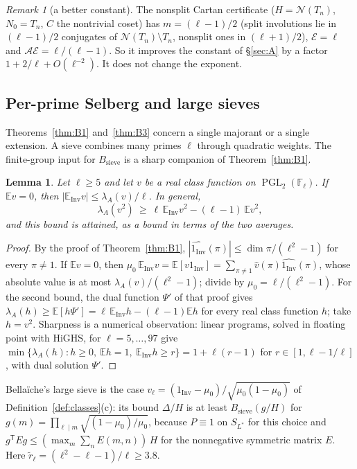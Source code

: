 \documentclass[11pt]{amsart}
\newtheorem{lemma}[theorem]{Lemma}
\theoremstyle{definition}
\theoremstyle{remark}
\newtheorem{remark}[theorem]{Remark}
\newcommand{\F}{\mathbb{F}}
\DeclareMathOperator{\PGL}{PGL}
\newcommand{\Inv}{\mathrm{Inv}}
\newcommand{\Nor}{\mathcal{N}}     %
\newcommand{\cA}{\mathcal{A}}      %
\newcommand{\cE}{\mathcal{E}}      %
\begin{document}
\begin{remark}[a better constant]
The nonsplit Cartan certificate ($H=\Nor(T_n)$, $N_0=T_n$, $C$ the nontrivial coset) has $m=(\ell-1)/2$ (split
involutions lie in $(\ell-1)/2$ conjugates of $\Nor(T_n)\setminus T_n$, nonsplit ones in $(\ell+1)/2$), $\cE=\ell$ and
$\cA\cE=\ell/(\ell-1)$. So it improves the constant of \S\ref{sec:A} by a factor $1+2/\ell+O(\ell^{-2})$. It does not
change the exponent.
\end{remark}

\subsection{Per-prime Selberg and large sieves}\label{subsec:B-sieve}

Theorems~\ref{thm:B1} and~\ref{thm:B3} concern a single majorant or a single extension. A sieve combines many primes
$\ell$ through quadratic weights. The finite-group input for $B_{\mathrm{sieve}}$ is a sharp companion of
Theorem~\ref{thm:B1}.

\begin{lemma}\label{lem:S1}
Let $\ell\ge5$ and let $v$ be a real class function on $\PGL_2(\F_\ell)$. If $\mathbb E v=0$, then
$|\mathbb E_{\Inv}v|\le\lambda_A(v)/\ell$. In general,
\[
  \lambda_A(v^2)\ \ge\ \ell\,\mathbb E_{\Inv}v^2-(\ell-1)\,\mathbb E v^2 ,
\]
and this bound is attained, as a bound in terms of the two averages.
\end{lemma}

\begin{proof}
By the proof of Theorem~\ref{thm:B1}, $|\widehat{1_{\Inv}}(\pi)|\le\dim\pi/(\ell^2-1)$ for every $\pi\ne1$. If
$\mathbb Ev=0$, then $\mu_0\,\mathbb E_{\Inv}v=\mathbb E[v1_{\Inv}]=\sum_{\pi\ne1}\widehat v(\pi)\widehat{1_{\Inv}}(\pi)$,
whose absolute value is at most $\lambda_A(v)/(\ell^2-1)$; divide by $\mu_0=\ell/(\ell^2-1)$. For the second bound, the
dual function $\Psi'$ of that proof gives $\lambda_A(h)\ge\mathbb E[h\Psi']=\ell\,\mathbb E_{\Inv}h-(\ell-1)\mathbb E h$
for every real class function $h$; take $h=v^2$. Sharpness is a numerical observation: linear programs, solved in floating
point with HiGHS, for $\ell=5,\dots,97$ give $\min\{\lambda_A(h):h\ge0,\ \mathbb Eh=1,\ \mathbb E_{\Inv}h\ge r\}=1+\ell(r-1)$ for
$r\in[1,\ell-1/\ell]$, with dual solution $\Psi'$.
\end{proof}

Bella\"iche's large sieve \cite[Thm.~14]{Bel16} is the case $v_\ell=(1_{\Inv}-\mu_0)/\sqrt{\mu_0(1-\mu_0)}$ of
Definition~\ref{def:classes}(c): its bound $\Delta/H$ is at least $B_{\mathrm{sieve}}(g/H)$ for
$g(m)=\prod_{\ell\mid m}\sqrt{(1-\mu_0)/\mu_0}$, because $P\equiv1$ on $S_{L^*}$ for this choice and
$g^{\mathsf T}Eg\le(\max_m\sum_nE(m,n))\,H$ for the nonnegative symmetric matrix $E$. Here
$\tilde r_\ell=(\ell^2-\ell-1)/\ell\ge3.8$.
\end{document}
